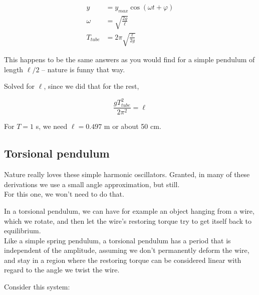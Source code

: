\begin{align}
y &= y_{max} \cos(\omega t + \varphi)\\
\omega &= \sqrt{\frac{2 g}{\ell}}\\
T_{tube} &= 2 \pi \sqrt{\frac{\ell}{2 g}}
\end{align}

This happens to be the same answers as you would find for a simple pendulum of length $\ell/2$ -- nature is funny that way.

Solved for $\ell$, since we did that for the rest,

\begin{equation}
\frac{g T_{tube}^2}{2 \pi^2} = \ell
\end{equation}

For $T = 1$ s, we need $\ell = 0.497$ m or about 50 cm.

\subsection{Torsional pendulum}

Nature really loves these simple harmonic oscillators. Granted, in many of these derivations we use a small angle approximation, but still.\\
For this one, we won't need to do that.

In a torsional pendulum, we can have for example an object hanging from a wire, which we rotate, and then let the wire's restoring torque try to get itself back to equilibrium.\\
Like a simple spring pendulum, a torsional pendulum has a period that is independent of the amplitude, assuming we don't permanently deform the wire, and stay in a region where the restoring torque can be considered linear with regard to the angle we twist the wire.

Consider this system:

\begin{figure}[H]
\centering
{}%
\end{figure}


